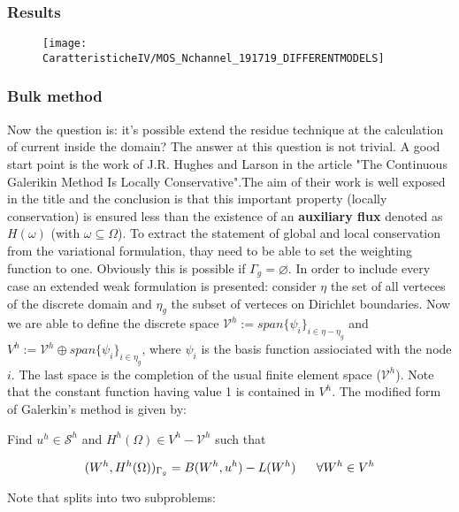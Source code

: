 \subsubsection{Results}

\begin{figure}[!h]
\texttt{[image: CaratteristicheIV/MOS\_Nchannel\_191719\_DIFFERENTMODELS]}
\end{figure}

\clearpage 

\subsubsection{Bulk method}
Now the question is: it's possible extend the residue technique at the calculation of current inside the domain? The answer at this question is not trivial. A good start point is the work of J.R. Hughes and Larson in the article "The Continuous Galerikin Method Is Locally Conservative".The aim of their work is well exposed in the title and the conclusion is that this important property (locally conservation) is ensured less than the existence of an \textbf{auxiliary flux} denoted as $H(\omega)$ (with $\omega \subseteq\Omega$). 
To extract the statement of global and local conservation from the variational formulation, thay need to be able to set the weighting function to one. Obviously this is possible if $\Gamma_g=\varnothing$. In order to include every case an extended weak formulation is presented: consider $\eta$ the set of all verteces of the discrete domain and $\eta_g$ the subset of verteces on Dirichlet boundaries.
Now we are able to define the discrete space $\mathcal{V}^h:=span\{\psi_i\}_{i\in \eta - \eta_g} $ and  $V^h:=\mathcal{V}^h \oplus span\{\psi_i\}_{i\in \eta_g}$, where $\psi_i$ is the basis function assiociated with the node $i$.
The last space is the completion of the usual finite element space ($\mathcal{V}^h$). Note that the constant function having value 1 is contained in $V^h$. The modified form of Galerkin's method is given by:

Find $u^h\in \mathcal{S}^h$ and $H^h(\Omega)\in V^h - \mathcal{V}^h$ such that

\begin{equation}
\label{eq: extended weak formulation}
(W^h,H^h(\Omega))_{\Gamma_g}=B(W^h,u^h)-L(W^h) \psp{10} \forall W^h\in V^h
\end{equation}

Note that  splits into two subproblems:

